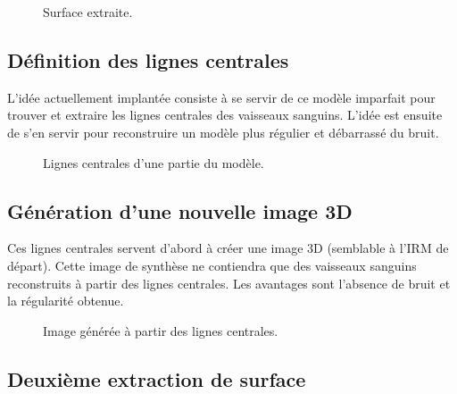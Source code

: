 \begin{figure}[H]
\begin{center}
\caption{Surface extraite.%
}
\end{center}
\label{fig:sfi}
\end{figure}

\subsection{Définition des lignes centrales}

L'idée actuellement implantée consiste à se servir de ce modèle imparfait pour trouver et extraire les lignes centrales des vaisseaux sanguins. L'idée est ensuite de s'en servir pour reconstruire un modèle plus régulier et débarrassé du bruit.

\begin{figure}[H]
\begin{center}
\caption{Lignes centrales d'une partie du modèle.%
}
\end{center}
\label{fig:cl}
\end{figure}

\subsection{Génération d'une nouvelle image 3D}

Ces lignes centrales servent d'abord à créer une image 3D (semblable à l'IRM de départ). Cette image de synthèse ne contiendra que des vaisseaux sanguins reconstruits à partir des lignes centrales. Les avantages sont l'absence de bruit et la régularité obtenue.

\begin{figure}[H]
\begin{center}
\caption{Image générée à partir des lignes centrales.%
}
\end{center}
\label{fig:ifcl}
\end{figure}

\subsection{Deuxième extraction de surface}
\label{arch:sfi2}

